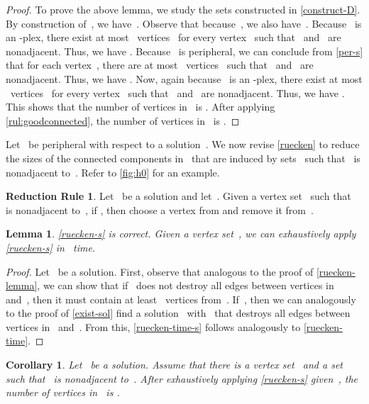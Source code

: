 \documentclass[12pt, a4paper, abstracton]{scrreprt}
\newcommand{\pl}[1]{\mbox{-plex}}
\newcounter{theorem}
\newtheorem{korollar}{Corollary}[chapter]
\newtheorem{lemma}{Lemma}[chapter]
\theoremstyle{definition}
\newtheorem{rul}{Reduction Rule}[chapter]
\theoremstyle{remark}
\begin{document}
\begin{proof}
  To prove the above lemma, we study the sets constructed in \autoref{construct-D}. By construction of~, we have~. Observe that because~, we also have~. Because~ is an \pl s, there exist at most~ vertices~ for every vertex~ such that~ and~ are nonadjacent. Thus, we have .  Because~ is peripheral, we can conclude from \autoref{per-s} that for each vertex~, there are at most ~vertices~ such that~ and~ are nonadjacent. Thus, we have .  Now, again because ~is an \pl s, there exist at most ~vertices~ for every vertex~ such that~ and~ are nonadjacent. Thus, we have .  This shows that the number of vertices in~ is .  After applying \autoref{rul:goodconnected}, the number of vertices in~ is .
\end{proof}

\noindent Let~ be peripheral with respect to a solution~. We now revise \autoref{ruecken} to reduce the sizes of the connected components in~ that are induced by sets~ such that~ is nonadjacent to~. Refer to \autoref{fig:h0} for an example.

\begin{rul}\label{ruecken-s}
  Let~ be a solution and let~. Given a vertex set~ such that~ is nonadjacent to~, if , then choose a vertex from  and remove it from~.
\end{rul}

\begin{lemma}\label{ruecken-time-s}
  \autoref{ruecken-s} is correct. Given a vertex set~, we can exhaustively apply \autoref{ruecken-s} in ~time.
\end{lemma}

\begin{proof}
  Let~ be a solution. First, observe that analogous to the proof of \autoref{ruecken-lemma}, we can show that if~ does not destroy all edges between vertices in~ and~, then it must contain at least~ vertices from~. If~, then we can analogously to the proof of \autoref{exist-sol} find a solution~ with~ that destroys all edges between vertices in~ and~. From this, \autoref{ruecken-time-s} follows analogously to \autoref{ruecken-time}.
\end{proof}

\begin{korollar}\label{h0-vertices-s}
  Let~ be a solution. Assume that there is a vertex set~ and a set~ such that~ is nonadjacent to~.  After exhaustively applying \autoref{ruecken-s} given~, the number of vertices in~ is .
\end{korollar}
 
\end{document}
